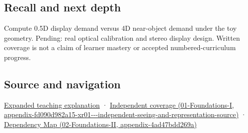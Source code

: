 \subsection{Recall and next depth}\label{appendix-f90cee1be7a4-recall-and-next-depth}

Compute 0.5D display demand versus 4D near-object demand under the toy geometry. Pending: real optical calibration and stereo display design. Written coverage is not a claim of learner mastery or accepted numbered-curriculum progress.

\subsection{Source and navigation}\label{appendix-f90cee1be7a4-source-and-navigation}

\href{Continuous\%20Notes/University\%20-\%20Worlds,\%20Images\%20and\%20Inference\%20-\%20Graphics,\%20Vision\%20and\%20Photography\#Focus\%20and\%20stereo\%20can\%20disagree\%20even\%20when\%20the\%20images\%20are\%20sharp}{Expanded teaching explanation} · \href{../01-Foundations-I/main.pdf\#nameddest=appendix-fd090d982a15-xr01---independent-seeing-and-representation-source}{Independent coverage (01-Foundations-I, appendix-fd090d982a15-xr01-\/-\/-independent-seeing-and-representation-source)} · \href{../02-Foundations-II/main.pdf\#nameddest=appendix-4ad47bdd269a}{Dependency Map (02-Foundations-II, appendix-4ad47bdd269a)}
